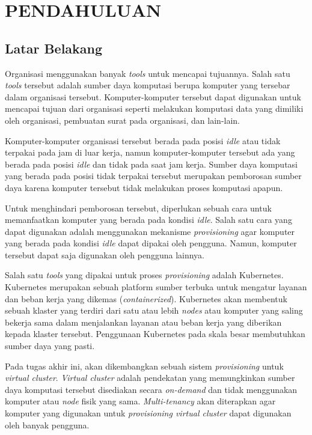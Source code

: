 \chapter{PENDAHULUAN}
\label{chap:pendahuluan}

\section{Latar Belakang}
\label{sec:latarbelakang}

Organisasi menggunakan banyak \emph{tools} untuk mencapai
tujuannya. Salah satu \emph{tools} tersebut adalah sumber daya
komputasi berupa komputer yang tersebar dalam organisasi tersebut. Komputer-komputer
tersebut dapat digunakan untuk mencapai tujuan dari organisasi seperti 
melakukan komputasi data yang dimiliki oleh organisasi, pembuatan
surat pada organisasi, dan lain-lain.

Komputer-komputer organisasi tersebut berada pada posisi
\emph{idle} atau tidak terpakai pada jam di luar kerja, namun
komputer-komputer tersebut ada yang berada pada posisi \emph{idle}
dan tidak pada saat jam kerja. Sumber daya komputasi yang berada
pada posisi tidak terpakai tersebut merupakan pemborosan sumber
daya karena komputer tersebut tidak melakukan proses komputasi apapun.

Untuk menghindari pemborosan tersebut, diperlukan sebuah cara untuk
memanfaatkan komputer yang berada pada kondisi \emph{idle}. Salah satu
cara yang dapat digunakan adalah menggunakan mekanisme \emph{provisioning}
agar komputer yang berada pada kondisi \emph{idle} dapat dipakai oleh
pengguna. Namun, komputer tersebut dapat saja digunakan oleh pengguna lainnya.

Salah satu \emph{tools} yang dipakai untuk proses \emph{provisioning} adalah
Kubernetes. Kubernetes merupakan sebuah platform sumber terbuka untuk mengatur
layanan dan beban kerja yang dikemas (\emph{containerized}). Kubernetes akan
membentuk sebuah klaster yang terdiri dari satu atau lebih \emph{nodes} atau
komputer yang saling bekerja sama dalam menjalankan layanan atau beban kerja
yang diberikan kepada klaster tersebut. Penggunaan Kubernetes pada skala besar
membutuhkan sumber daya yang pasti.

Pada tugas akhir ini, akan dikembangkan sebuah sistem \emph{provisioning} untuk \emph{virtual cluster}.
\emph{Virtual cluster} adalah pendekatan yang memungkinkan sumber daya komputasi tersebut disediakan
secara \emph{on-demand} dan tidak menggunakan komputer atau \emph{node} fisik yang sama. \emph{Multi-tenancy}
akan diterapkan agar komputer yang digunakan untuk \emph{provisioning virtual cluster} dapat digunakan
oleh banyak pengguna.

